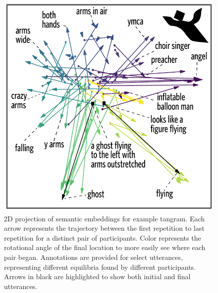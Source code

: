 \documentclass[alpha-refs]{wiley-article}
\begin{document}
\begin{figure}[t!]
\centering
\includegraphics[scale=.8]{tsne-tangramC_annotated.pdf}
\caption{2D projection of semantic embeddings for example tangram. Each arrow represents the trajectory between the first repetition to last repetition for a distinct pair of participants. Color represents the rotational angle of the final location to more easily see where each pair began. Annotations are provided for select utterances, representing different equilibria found by different participants. Arrows in black are highlighted to show both initial and final utterances.}
\label{fig:tsne}
\end{figure}
\end{document}
